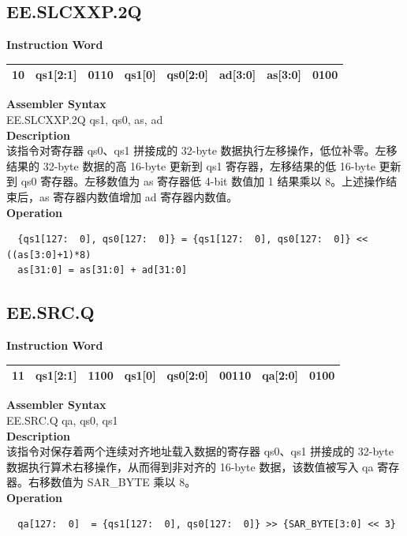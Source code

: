 \clearpage
\subsection{EE.SLCXXP.2Q}\label{instruction:EESLCXXP2Q}
\setlength\tabcolsep{6pt}
\textbf{Instruction Word} \\
\begin{tabular}{|c|c|c|c|c|c|c|c|}
	\hline
	10 & qs1[2:1] & 0110 & qs1[0] & qs0[2:0] & ad[3:0] & as[3:0] & 0100 \\
	\hline
\end{tabular}

\textbf{Assembler Syntax} \\
EE.SLCXXP.2Q qs1, qs0, as, ad \\
\textbf{Description} \\
该指令对寄存器 qs0、qs1 拼接成的 32-byte 数据执行左移操作，低位补零。左移结果的 32-byte 数据的高 16-byte 更新到 qs1 寄存器，左移结果的低 16-byte 更新到 qs0 寄存器。左移数值为 as 寄存器低 4-bit 数值加 1 结果乘以 8。上述操作结束后，as 寄存器内数值增加 ad 寄存器内数值。\\
\textbf{Operation}
\begin{lstlisting}
  {qs1[127:  0], qs0[127:  0]} = {qs1[127:  0], qs0[127:  0]} << ((as[3:0]+1)*8)
  as[31:0] = as[31:0] + ad[31:0]
\end{lstlisting}

\clearpage
\subsection{EE.SRC.Q}\label{instruction:EESRCQ}
\setlength\tabcolsep{6pt}
\textbf{Instruction Word} \\
\begin{tabular}{|c|c|c|c|c|c|c|c|}
	\hline
	11 & qs1[2:1] & 1100 & qs1[0] & qs0[2:0] & 00110 & qa[2:0] & 0100 \\
	\hline
\end{tabular}

\textbf{Assembler Syntax} \\
EE.SRC.Q qa, qs0, qs1 \\
\textbf{Description} \\
该指令对保存着两个连续对齐地址载入数据的寄存器 qs0、qs1 拼接成的 32-byte 数据执行算术右移操作，从而得到非对齐的 16-byte 数据，该数值被写入 qa 寄存器。右移数值为 SAR\_BYTE 乘以 8。\\
\textbf{Operation}
\begin{lstlisting}
  qa[127:  0]  = {qs1[127:  0], qs0[127:  0]} >> {SAR_BYTE[3:0] << 3}
\end{lstlisting}

